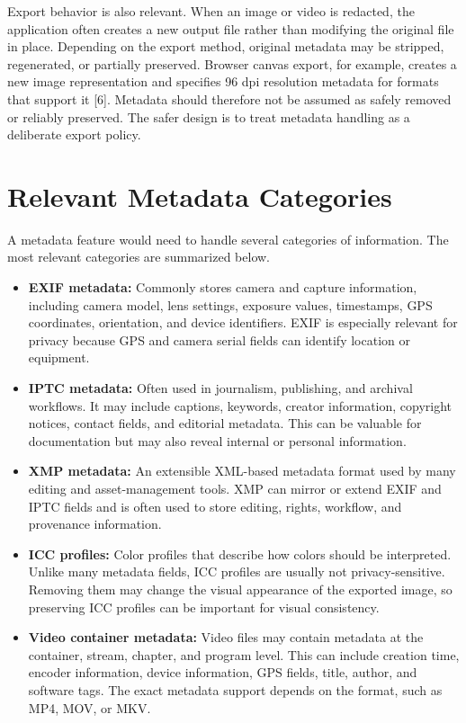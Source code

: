 Export behavior is also relevant. When an image or video is redacted, the application often creates a new output file rather than modifying the original file in place. Depending on the export method, original metadata may be stripped, regenerated, or partially preserved. Browser canvas export, for example, creates a new image representation and specifies 96 dpi resolution metadata for formats that support it [6]. Metadata should therefore not be assumed as safely removed or reliably preserved. The safer design is to treat metadata handling as a deliberate export policy.

\section{Relevant Metadata Categories}
\label{appsec:relevant_metadata_categories}

A metadata feature would need to handle several categories of information. The most relevant categories are summarized below.

\begin{itemize}[leftmargin=1.5em]
    \item \textbf{EXIF metadata:} Commonly stores camera and capture information, including camera model, lens settings, exposure values, timestamps, GPS coordinates, orientation, and device identifiers. EXIF is especially relevant for privacy because GPS and camera serial fields can identify location or equipment.
    \item \textbf{IPTC metadata:} Often used in journalism, publishing, and archival workflows. It may include captions, keywords, creator information, copyright notices, contact fields, and editorial metadata. This can be valuable for documentation but may also reveal internal or personal information.
    \item \textbf{XMP metadata:} An extensible XML-based metadata format used by many editing and asset-management tools. XMP can mirror or extend EXIF and IPTC fields and is often used to store editing, rights, workflow, and provenance information.
    \item \textbf{ICC profiles:} Color profiles that describe how colors should be interpreted. Unlike many metadata fields, ICC profiles are usually not privacy-sensitive. Removing them may change the visual appearance of the exported image, so preserving ICC profiles can be important for visual consistency.
    \item \textbf{Video container metadata:} Video files may contain metadata at the container, stream, chapter, and program level. This can include creation time, encoder information, device information, GPS fields, title, author, and software tags. The exact metadata support depends on the format, such as MP4, MOV, or MKV.
\end{itemize}

